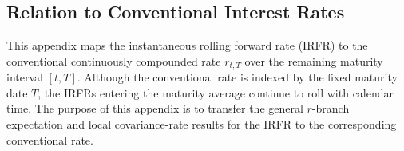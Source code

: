 \documentclass[12pt]{article}
\theoremstyle{statementstyle}
\begin{document}
\begin{appendices}
%



\section{Relation to Conventional Interest Rates}
\label{appendix:C}

This appendix maps the instantaneous rolling forward rate (IRFR) to the
conventional continuously compounded rate $r_{t,T}$ over the remaining
maturity interval $[t,T]$. Although the conventional rate is indexed by
the fixed maturity date $T$, the IRFRs entering the maturity average
continue to roll with calendar time. The purpose of this appendix is to
transfer the general $r$-branch expectation and local covariance-rate
results for the IRFR to the corresponding conventional rate.


\end{appendices}
\end{document}
